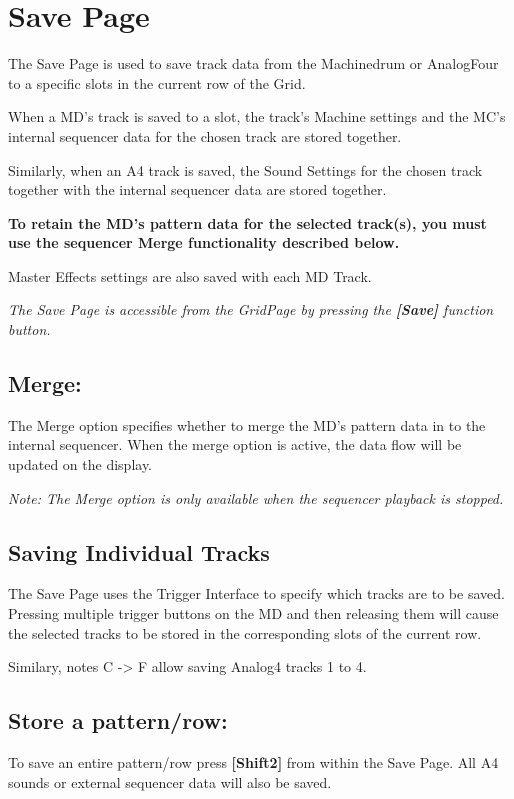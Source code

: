 \chapter{Save Page}

The Save Page is used to save track data from the Machinedrum or AnalogFour to a specific slots in the current row of the Grid.

When a MD's track is saved to a slot, the track's Machine settings and the MC's internal sequencer data for the chosen track are stored together.

Similarly, when an A4 track is saved, the Sound Settings for the chosen track together with the internal sequencer data are stored together.

\textbf{To retain the MD's pattern data for the selected track(s), you must use the sequencer Merge functionality described below.}

Master Effects settings are also saved with each MD Track.


\textit{The Save Page is accessible from the GridPage by pressing the  \textbf{[Save]} function button.}


\section{Merge:}
The Merge option specifies whether to merge the MD's pattern data in to the internal sequencer. When the merge option is active, the data flow will be updated on the display.


\textit{Note: The Merge option is only available when the sequencer playback is stopped.}
\\

\section{Saving Individual Tracks}
The Save Page uses the Trigger Interface to specify which tracks are to be saved. Pressing multiple trigger buttons on the MD and then releasing them will cause the selected tracks to be stored in the corresponding slots of the current row.

Similary, notes C -> F allow saving Analog4 tracks 1 to 4.
\section{Store a pattern/row:}
To save an entire pattern/row press \textbf{[Shift2]} from within the Save Page. All A4 sounds or external sequencer data will also be saved.



